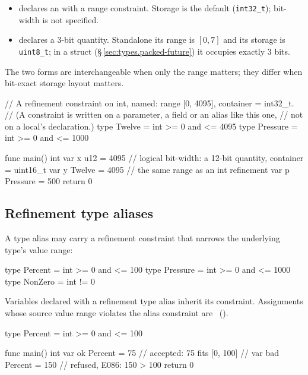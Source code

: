 \begin{itemize}
  \item {} declares an  with a range
        constraint. Storage is the  default (\texttt{int32\_t});
        bit-width is not specified.
  \item {} declares a 3-bit quantity. Standalone its range is
        \([0, 7]\) and its storage is \texttt{uint8\_t}; in a
        \lain{[packed]} struct (\S\,\ref{sec:types.packed-future}) it occupies exactly 3 bits.
\end{itemize}

The two forms are interchangeable when only the range matters; they
differ when bit-exact storage layout matters.

\begin{example}
\begin{laincode}
// A refinement constraint on int, named: range [0, 4095], container = int32_t.
// (A constraint is written on a parameter, a field or an alias like this one,
// not on a local's declaration.)
type Twelve = int >= 0 and <= 4095
type Pressure = int >= 0 and <= 1000

func main() int {
    var x u12 = 4095        // logical bit-width: a 12-bit quantity, container = uint16_t
    var y Twelve = 4095     // the same range as an int refinement
    var p Pressure = 500
    return 0
}
\end{laincode}
\end{example}

\subsection{Refinement type aliases}
\label{sec:types.alias-refinement}

\pnum
A type alias may carry a refinement constraint that narrows the underlying
type's value range:

\begin{laincode}
type Percent = int >= 0 and <= 100
type Pressure = int >= 0 and <= 1000
type NonZero = int != 0
\end{laincode}

\pnum
Variables declared with a refinement type alias inherit its constraint.
Assignments whose source value range violates the alias constraint are
\illformed{}~().

\begin{example}
\begin{laincode}
type Percent = int >= 0 and <= 100

func main() int {
    var ok Percent = 75              // accepted: 75 fits [0, 100]
    // var bad Percent = 150         // refused, E086: 150 > 100
    return 0
}
\end{laincode}
\end{example}

